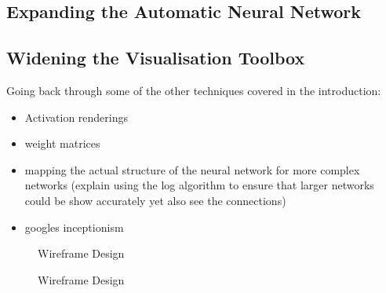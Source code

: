 \documentclass[a4paper,11pt,titlepage]{article}
\begin{document}
	\subsection{Expanding the Automatic Neural Network}		
	\subsection{Widening the Visualisation Toolbox}
	
	Going back through some of the other techniques covered in the introduction:
	
	\begin{itemize}
		\item Activation renderings 
		\item weight matrices
		\item mapping the actual structure of the neural network for more complex networks (explain using the log algorithm to ensure that larger networks could be show accurately yet also see the connections)
		\item googles inceptionism
	\end{itemize}		
	
	\begin{figure}[H]
    			\caption{Wireframe Design}%
	\end{figure}	
	
	\begin{figure}[H]
    			\caption{Wireframe Design}%
	\end{figure}	
	
\end{document}
